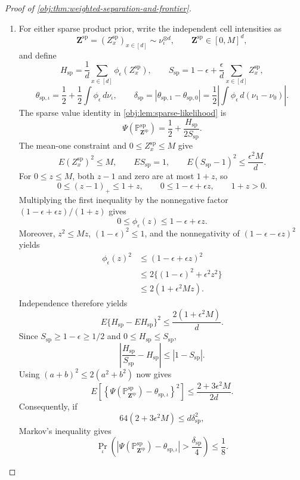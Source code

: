 \begin{proof}[Proof of \cref{obj:thm:weighted-separation-and-frontier}]
\begin{enumerate}
\item
For either sparse product prior, write the independent cell intensities as
\[
\mathbf Z^{\mathrm{sp}}
=(Z_x^{\mathrm{sp}})_{x\in[d]}
\sim\nu_\iota^{\otimes d},
\qquad
\mathbf Z^{\mathrm{sp}}\in[0,M]^d,
\]
and define
\[
H_{\mathrm{sp}}
=\frac1d\sum_{x\in[d]}\phi_\epsilon(Z_x^{\mathrm{sp}}),
\qquad
S_{\mathrm{sp}}
=1-\epsilon+\frac{\epsilon}{d}\sum_{x\in[d]}Z_x^{\mathrm{sp}},
\]
\[
\theta_{\mathrm{sp},\iota}
=\frac12+\frac12\int\phi_\epsilon\,d\nu_\iota,
\qquad
\delta_{\mathrm{sp}}
=|\theta_{\mathrm{sp},1}-\theta_{\mathrm{sp},0}|
=\frac12\left|\int\phi_\epsilon\,d(\nu_1-\nu_0)\right|.
\]
The sparse value identity in
\cref{obj:lem:sparse-likelihood} is
\[
\Psi(\mathbb P_{\mathbf Z^{\mathrm{sp}}}^{\mathrm{sp}})
=\frac12+\frac{H_{\mathrm{sp}}}{2S_{\mathrm{sp}}}.
\]
The mean-one constraint and \(0\le Z_x^{\mathrm{sp}}\le M\) give
\[
E (Z_x^{\mathrm{sp}})^2\le M,
\qquad
E S_{\mathrm{sp}}=1,
\qquad
E(S_{\mathrm{sp}}-1)^2\le\frac{\epsilon^2M}{d}.
\]
For \(0\le z\le M\), both \(z-1\) and zero are at most \(1+z\), so
\[
0\le(z-1)_+\le1+z,
\qquad
0\le1-\epsilon+\epsilon z,
\qquad
1+z>0.
\]
Multiplying the first inequality by the nonnegative factor
\((1-\epsilon+\epsilon z)/(1+z)\) gives
\[
0\le\phi_\epsilon(z)\le1-\epsilon+\epsilon z.
\]
Moreover, \(z^2\le Mz\), \((1-\epsilon)^2\le1\), and the nonnegativity of
\((1-\epsilon-\epsilon z)^2\) yields
\[
\begin{aligned}
\phi_\epsilon(z)^2
&\le(1-\epsilon+\epsilon z)^2\\
&\le2\{(1-\epsilon)^2+\epsilon^2z^2\}\\
&\le2(1+\epsilon^2Mz).
\end{aligned}
\]
Independence therefore yields
\[
E\{H_{\mathrm{sp}}-EH_{\mathrm{sp}}\}^2
\le\frac{2(1+\epsilon^2M)}d.
\]
Since \(S_{\mathrm{sp}}\ge1-\epsilon\ge1/2\) and
\(0\le H_{\mathrm{sp}}\le S_{\mathrm{sp}}\),
\[
\left|\frac{H_{\mathrm{sp}}}{S_{\mathrm{sp}}}
-H_{\mathrm{sp}}\right|
\le|1-S_{\mathrm{sp}}|.
\]
Using \((a+b)^2\le2(a^2+b^2)\) now gives
\[
E\left[
\left\{\Psi(\mathbb P_{\mathbf Z^{\mathrm{sp}}}^{\mathrm{sp}})
-\theta_{\mathrm{sp},\iota}\right\}^2
\right]
\le\frac{2+3\epsilon^2M}{2d}.
\]
Consequently, if
\[
64(2+3\epsilon^2M)\le d\delta_{\mathrm{sp}}^2,
\]
Markov's inequality gives
\[
\Pr_\iota\left(
\left|\Psi(\mathbb P_{\mathbf Z^{\mathrm{sp}}}^{\mathrm{sp}})
-\theta_{\mathrm{sp},\iota}\right|
>\frac{\delta_{\mathrm{sp}}}{4}
\right)\le\frac18.
\]


\end{enumerate}
\end{proof}
